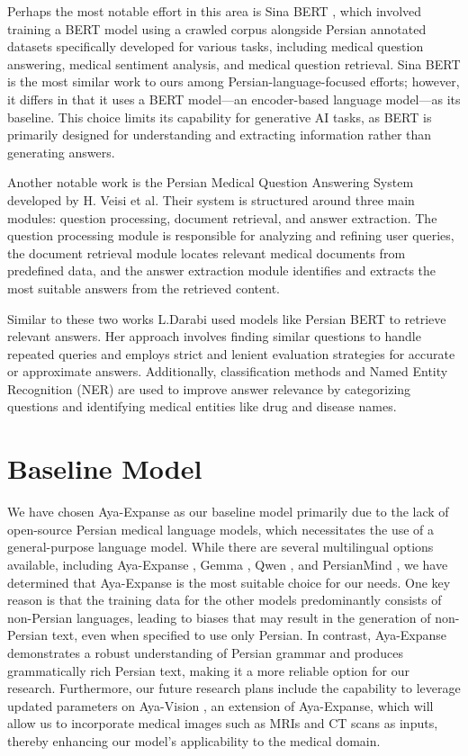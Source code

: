 \documentclass[conference]{IEEEtran}
\begin{document}
Perhaps the most notable effort in this area is Sina BERT \cite{b4}, which involved training a BERT model using a crawled corpus alongside Persian annotated datasets specifically developed for various tasks, including medical question answering, medical sentiment analysis, and medical question retrieval. Sina BERT is the most similar work to ours among Persian-language-focused efforts; however, it differs in that it uses a BERT model—an encoder-based language model—as its baseline. This choice limits its capability for generative AI tasks, as BERT is primarily designed for understanding and extracting information rather than generating answers.

Another notable work is the Persian Medical Question Answering System developed by H. Veisi et al.
\cite{b5}
Their system is structured around three main modules: question processing, document retrieval, and answer extraction. The question processing module is responsible for analyzing and refining user queries, the document retrieval module locates relevant medical documents from predefined data, and the answer extraction module identifies and extracts the most suitable answers from the retrieved content.

Similar to these two works L.Darabi
\cite{b6}
used models like Persian BERT
\cite{b7}
to retrieve relevant answers. Her approach involves finding similar questions to handle repeated queries and employs strict and lenient evaluation strategies for accurate or approximate answers. Additionally, classification methods and Named Entity Recognition (NER) are used to improve answer relevance by categorizing questions and identifying medical entities like drug and disease names.

\section{Baseline Model}
We have chosen Aya-Expanse as our baseline model primarily due to the lack of open-source Persian medical language models, which necessitates the use of a general-purpose language model. While there are several multilingual options available, including Aya-Expanse \cite{b5}, Gemma \cite{b11}, Qwen \cite{b12}, and PersianMind \cite{b12}, we have determined that Aya-Expanse is the most suitable choice for our needs. One key reason is that the training data for the other models predominantly consists of non-Persian languages, leading to biases that may result in the generation of non-Persian text, even when specified to use only Persian. In contrast, Aya-Expanse demonstrates a robust understanding of Persian grammar and produces grammatically rich Persian text, making it a more reliable option for our research. Furthermore, our future research plans include the capability to leverage updated parameters on Aya-Vision
\cite{b12}
, an extension of Aya-Expanse, which will allow us to incorporate medical images such as MRIs and CT scans as inputs, thereby enhancing our model’s applicability to the medical domain.
\end{document}
